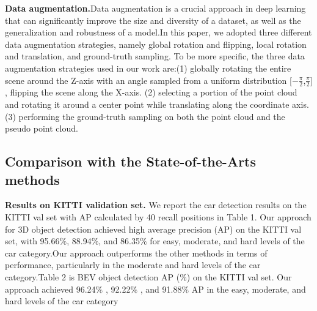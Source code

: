 \begin{sloppypar}
{\bfseries Data augmentation.}Data augmentation is a crucial approach in deep learning that can significantly improve the size and diversity of a dataset, as well as the generalization and robustness of a model.In this paper, we adopted three different data augmentation strategies, namely global rotation and flipping, local rotation and translation, and ground-truth sampling. To be more specific, the three data augmentation strategies used in our work are:(1) globally rotating the entire scene around the Z-axis with an angle sampled from a uniform distribution [$-\frac{\pi}{2}$,$\frac{\pi}{2}$] , flipping the scene along the X-axis. (2) selecting a portion of the point cloud and rotating it around a center point while translating along the coordinate axis. (3) performing the ground-truth sampling on both the point cloud and the pseudo point cloud.

\subsection{Comparison with the State-of-the-Arts methods}
{\bfseries Results on KITTI validation set.} We report the car detection results on the KITTI val set with AP calculated by 40 recall positions in Table 1. Our approach for 3D object detection achieved high average precision (AP) on the KITTI val set, with 95.66$\%$, 88.94$\%$, and 86.35$\%$ for easy, moderate, and hard levels of the car category.Our approach outperforms the other methods in terms of performance, particularly in the moderate and hard levels of the car category.Table 2 is BEV object detection AP ($\%$) on the KITTI val set. Our approach achieved 96.24$\%$ , 92.22$\%$ , and 91.88$\%$ AP in the easy, moderate, and hard levels of the car category


\end{sloppypar}
